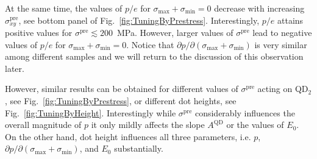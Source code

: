 At the same time, the values of $p/e$ for ${\sigma_{\mathrm{max}}+\sigma_{\mathrm{min}}=0}$ decrease with increasing  $\sigma_{xy}^\text{pre}$, see bottom panel of Fig.~\ref{fig:TuningByPrestress}. Interestingly, $p/e$ attains positive values for  $\sigma^\text{pre}\lesssim 200$~MPa. However, larger values of $\sigma^\text{pre}$ lead to negative values of $p/e$ for $\sigma_{\mathrm{max}}+\sigma_{\mathrm{min}}=0$. Notice that $\partial p/\partial(\sigma_{\mathrm{max}}+\sigma_{\mathrm{min}})$ is very similar among different samples and we will return to the discussion of this observation later.




However, similar results can be obtained for different values of $\sigma^{\mathrm{pre}}$ acting on QD$_2$, see Fig.~\ref{fig:TuningByPrestress}, or different dot heights, see Fig.~\ref{fig:TuningByHeight}. Interestingly while $\sigma^{\mathrm{pre}}$ considerably influences the overall magnitude of $p$ it only mildly affects the slope $A^{\mathrm{QD}}$ or the values of $E_0$. On the other hand, dot height influences all three parameters, i.e. $p$, $\partial p/\partial(\sigma_{\mathrm{max}}+\sigma_{\mathrm{min}})$, and $E_0$ substantially.



%









%

